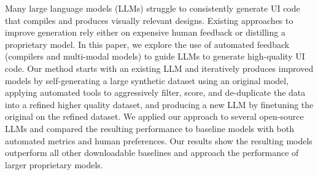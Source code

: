 Many large language models (LLMs) struggle to consistently generate UI code that compiles and produces visually relevant designs. Existing approaches to improve generation rely either on expensive human feedback or distilling a proprietary model. In this paper, we explore the use of automated feedback (compilers and multi-modal models) to guide LLMs to generate high-quality UI code. Our method starts with an existing LLM and iteratively produces improved models by self-generating a large synthetic dataset using an original model, applying automated tools to aggressively filter, score, and de-duplicate the data into a refined higher quality dataset, and producing a new LLM by finetuning the original on the refined dataset. We applied our approach to several open-source LLMs and compared the resulting performance to baseline models with both automated metrics and human preferences. Our results show the resulting models outperform all other downloadable baselines and approach the performance of larger proprietary models.